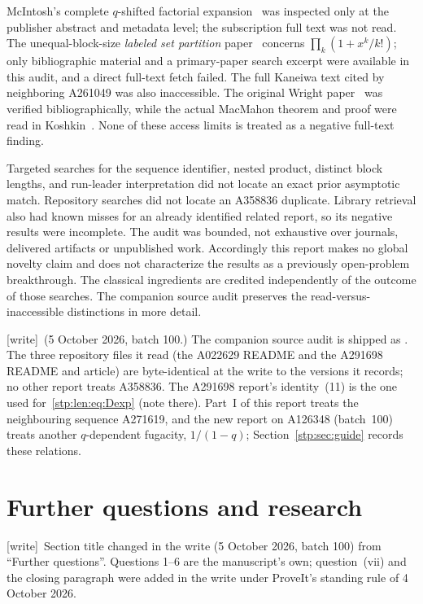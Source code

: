 \documentclass[11pt]{article}
\theoremstyle{remark}\newtheorem{remark}[theorem]{Remark}
\newcommand{\wtag}{\textup{[write]}}
\begin{document}
McIntosh's complete $q$-shifted factorial expansion~\cite{mcintosh} was inspected only at the publisher abstract and metadata level; the subscription full text was not read. The unequal-block-size \emph{labeled set partition} paper~\cite{unequal} concerns $\prod_k(1+x^k/k!)$; only bibliographic material and a primary-paper search excerpt were available in this audit, and a direct full-text fetch failed. The full Kaneiwa text cited by neighboring A261049 was also inaccessible. The original Wright paper~\cite{wright} was verified bibliographically, while the actual MacMahon theorem and proof were read in Koshkin~\cite{koshkin}. None of these access limits is treated as a negative full-text finding.

Targeted searches for the sequence identifier, nested product, distinct block lengths, and run-leader interpretation did not locate an exact prior asymptotic match. Repository searches did not locate an A358836 duplicate. Library retrieval also had known misses for an already identified related report, so its negative results were incomplete. The audit was bounded, not exhaustive over journals, delivered artifacts or unpublished work. Accordingly this report makes no global novelty claim and does not characterize the results as a previously open-problem breakthrough. The classical ingredients are credited independently of the outcome of those searches. The companion source audit preserves the read-versus-inaccessible distinctions in more detail.

\wtag\ (5 October 2026, batch 100.) The companion source audit is shipped as
. The three repository files it read (the
A022629 README and the A291698 README and article) are byte-identical at the
write to the versions it records; no other report treats A358836. The
A291698 report's identity~(11) is the one used for~\eqref{stp:len:eq:Dexp}
(note there). Part~I of this report treats the neighbouring sequence
A271619, and the new report on A126348 (batch~100) treats another
$q$-dependent fugacity, $1/(1-q)$; Section~\ref{stp:sec:guide} records
these relations.

\section{Further questions and research}\label{stp:len:sec:questions}
\wtag\ Section title changed in the write (5 October 2026, batch 100) from
``Further questions''. Questions 1--6 are the manuscript's own; question~(vii)
and the closing paragraph were added in the write under ProveIt's standing
rule of 4 October 2026.
\end{document}
